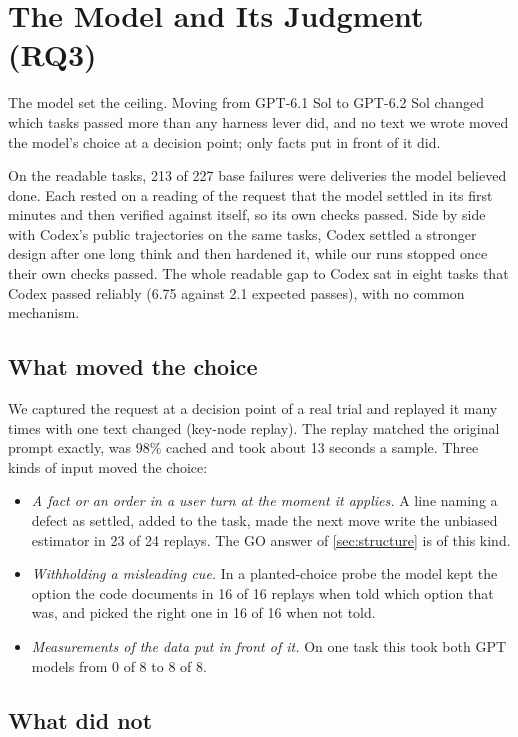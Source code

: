 \section{The Model and Its Judgment (RQ3)}
\label{sec:judgment}

The model set the ceiling. Moving from GPT-6.1 Sol to GPT-6.2 Sol changed which tasks passed more
than any harness lever did, and no text we wrote moved the model's choice at a decision point; only
facts put in front of it did.

 On the readable tasks, 213 of 227 base failures were
deliveries the model believed done. Each rested on a reading of the request that the model settled
in its first minutes and then verified against itself, so its own checks passed. Side by side with
Codex's public trajectories on the same tasks, Codex settled a stronger design after one long think
and then hardened it, while our runs stopped once their own checks passed. The whole readable gap
to Codex sat in eight tasks that Codex passed reliably (6.75 against 2.1 expected passes), with no
common mechanism.

\subsection{What moved the choice}

We captured the request at a decision point of a real trial and replayed it many times with one
text changed (key-node replay). The replay matched the original prompt exactly, was 98\% cached and
took about 13 seconds a sample. Three kinds of input moved the choice:
\begin{itemize}[leftmargin=1.4em]
  \item \emph{A fact or an order in a user turn at the moment it applies.} A line naming a defect as
    settled, added to the task, made the next move write the unbiased estimator in 23 of 24
    replays. The GO answer of \cref{sec:structure} is of this kind.
  \item \emph{Withholding a misleading cue.} In a planted-choice probe the model kept the option the
    code documents in 16 of 16 replays when told which option that was, and picked the right one in
    16 of 16 when not told.
  \item \emph{Measurements of the data put in front of it.} On one task this took both GPT models
    from 0 of 8 to 8 of 8.
\end{itemize}

\subsection{What did not}


